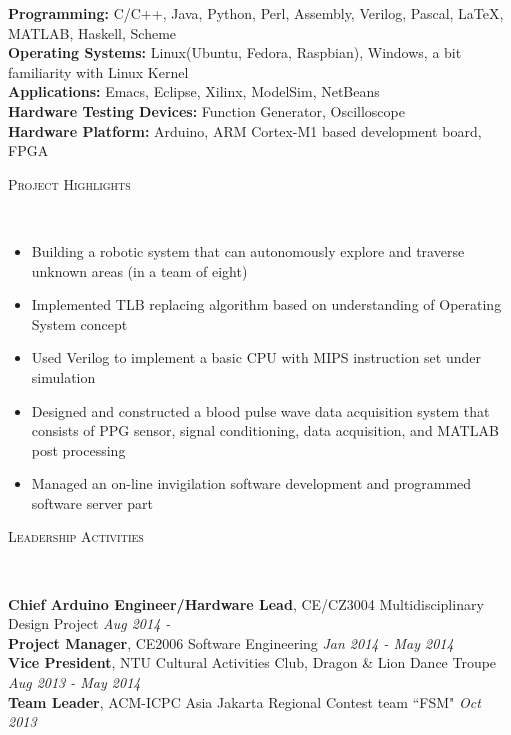 \documentclass[a4paper]{article}
\newenvironment{changemargin}[2]{%
  \begin{list}{}{%
      \setlength{\topsep}{0pt}%
      \setlength{\leftmargin}{#1}%
      \setlength{\rightmargin}{#2}%
      \setlength{\listparindent}{\parindent}%
      \setlength{\itemindent}{\parindent}%
      \setlength{\parsep}{\parskip}%
    }%
  \item[]}{\end{list}
}
\newcommand{\lineover}{
  \begin{changemargin}{-0.05in}{-0.05in}
    \vspace*{-8pt}
    \hrulefill \\
    \vspace*{-2pt}
  \end{changemargin}
}
\newcommand{\header}[1]{
  \begin{changemargin}{-0.5in}{-0.5in}
    \scshape{#1}\\
    \lineover
  \end{changemargin}
}
\newenvironment{body}
{
\vspace*{-16pt}
\begin{changemargin}{-0.25in}{-0.5in}
}	
{
\end{changemargin}
}
\begin{document}
\begin{body}
  \vspace{14pt}
  \textbf{Programming:}{} C/C++, Java, Python, Perl, Assembly, Verilog, Pascal, \LaTeX, MATLAB, Haskell, Scheme\\
  \medskip
  \textbf{Operating Systems:}{} Linux(Ubuntu, Fedora, Raspbian), Windows, a bit familiarity with Linux Kernel\\
  \medskip
  \textbf{Applications:}{} Emacs, Eclipse, Xilinx, ModelSim, NetBeans\\
  \medskip
  \textbf{Hardware Testing Devices:}{} Function Generator, Oscilloscope\\
  \medskip
  \textbf{Hardware Platform:}{} Arduino, ARM Cortex-M1 based development board, FPGA\\
\end{body}

\smallskip
\header{Project Highlights}
\begin{body}
  \vspace{14pt}
  \begin{itemize} \itemsep 2pt
  \item Building a robotic system that can autonomously explore and traverse unknown areas (in a team of eight)
  \item Implemented TLB replacing algorithm based on understanding of Operating System concept
  \item Used Verilog to implement a basic CPU with MIPS instruction set under simulation
  \item Designed and constructed a blood pulse wave data acquisition system that consists of PPG sensor, signal conditioning, data acquisition, and MATLAB post processing
  \item Managed an on-line invigilation software development and programmed software server part
  \end{itemize}
\end{body}

\smallskip

\header{Leadership Activities}

\begin{body}
  \vspace{14pt}
  \textbf{Chief Arduino Engineer/Hardware Lead}, CE/CZ3004 Multidisciplinary Design Project \hfill {} \emph{Aug 2014 - }\\
  \smallskip
  \textbf{Project Manager}, CE2006 Software Engineering \hfill {} \emph{Jan 2014 - May 2014}\\
  \smallskip
  \textbf{Vice President}, NTU Cultural Activities Club, Dragon \& Lion Dance Troupe \hfill {} \emph{Aug 2013 - May 2014}\\
  \smallskip
  \textbf{Team Leader}, ACM-ICPC Asia Jakarta Regional Contest team ``FSM" \hfill {} \emph{Oct 2013}\\
\end{body}
\end{document}
